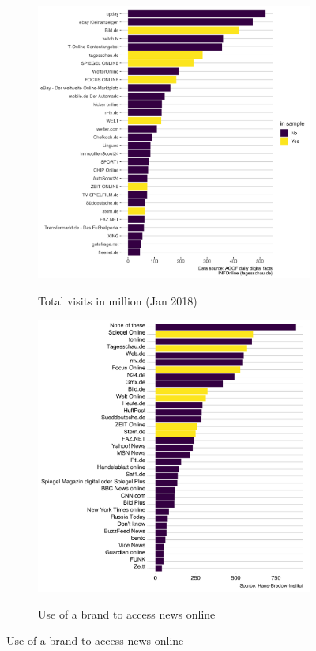 \documentclass[12pt,a4paper,notitlepage]{article}
\begin{document}
\begin{figure}[H]
	\begin{center}
	\caption{Selected news brands}
		\begin{subfigure}[normla]{0.49\textwidth}
			\caption{Total visits in million (Jan 2018)}
			\includegraphics[width=\textwidth]{../figs/visits}
			\label{fig_visits}
		\end{subfigure}
		\begin{subfigure}[normla]{0.49\textwidth}
			\caption{Use of a brand to access news online}
			\includegraphics[width=\textwidth]{../figs/reuters1}
			\label{fig_reuters1}
		\end{subfigure}
	\end{center}
\end{figure}
\end{document}
